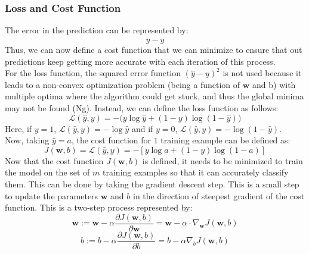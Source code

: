 \documentclass{article}
\begin{document}
\subsubsection{Loss and Cost Function}
The error in the prediction can be represented by:
$$y - \hat{y}$$
Thus, we can now define a cost function that we can minimize to ensure that out predictions keep getting more accurate with each iteration of this process.
\\
For the loss function, the squared error function $(\hat{y}-y)^2$ is not used because it leads to a non-convex optimization problem (being a function of $\mathbf{w}$ and b) with multiple optima where the algorithm could get stuck, and thus the global minima may not be found (Ng). Instead, we can define the loss function as follows:
\begin{equation}
    \mathcal{L}(\hat{y},y)=-(y\log \hat{y} + (1-y)\log{(1-\hat{y}))}
\end{equation}
Here, if $y=1$, $\mathcal{L}(\hat{y},y)=-\log \hat{y}$ and if $y=0$, $\mathcal{L}(\hat{y},y)=-\log (1-\hat{y})$.
\\Now, taking $\hat{y}=a$, the cost function for $1$ training example can be defined as:
\begin{equation}
    J(\mathbf{w},b)=\mathcal{L}(\hat{y},y) = -[y\log a + (1-y)\log{(1-a)}]
\end{equation}
Now that the cost function $J(\mathbf{w}, b)$ is defined, it needs to be minimized to train the model on the set of $m$ training examples so that it can accurately classify them. This can be done by taking the gradient descent step. This is a small step to update the parameters $\mathbf{w}$ and $b$ in the direction of steepest gradient of the cost function. This is a two-step process represented by:
\begin{equation}
    \mathbf{w} := \mathbf{w} - \alpha \frac{\partial J(\mathbf{w}, b)}{\partial \mathbf{w}} = \mathbf{w} - \alpha \cdot \nabla_\mathbf{w}J(\mathbf{w}, b)
\end{equation}
\begin{equation}
    b:=b-\alpha \frac{\partial J(\mathbf{w}, b)}{\partial b}=b-\alpha \nabla_{b}J(\mathbf{w},b)
\end{equation}
\end{document}
